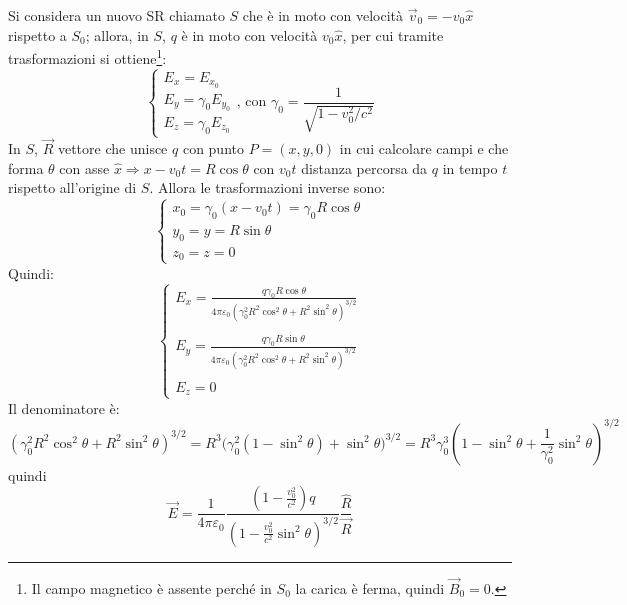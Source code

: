 \documentclass[a4paper]{scrartcl}
\numberwithin{equation}{subsection}
\theoremstyle{style1}
\begin{document}
Si considera un nuovo SR chiamato $S$ che \`e in moto con velocit\`a $\vec{v}_0 =  - v_0\hat{x}$ rispetto a $S_0$; allora, in $S$, $q $ \`e in moto con velocit\`a $v_0\hat{x}$, per cui tramite trasformazioni si ottiene\footnote{Il campo magnetico \`e assente perch\'e in $S_0$ la carica \`e ferma, quindi $\vec{B}_0 = 0$.}:
\begin{equation}
	\begin{cases}
		E_x = E_{x_0} \\
		E_y = \gamma_0 E_{y_0} \\
		E_{z} = \gamma_0 E_{z_0} 
	\end{cases} \text{, con } \gamma_0 = \frac{1}{\sqrt{1- v_0^2 / c^2} }
\end{equation}
In $S$, $\vec{R}$ vettore che unisce $q$ con punto $P=(x,y,0)$ in cui calcolare campi e che forma $\theta $ con asse $\hat{x} \Rightarrow x-v_0 t = R\cos \theta $ con $v_0 t$ distanza percorsa da $q$ in tempo $t$ rispetto all'origine di $S$. Allora le trasformazioni inverse sono:
\begin{equation}
	\begin{cases}
	x_0 = \gamma_0 (x-v_0t) = \gamma_0 R\cos\theta \\
	y_0 = y = R \sin \theta \\
	z_0 = z = 0
	\end{cases}
\end{equation}
Quindi:
\begin{equation}
	\begin{cases}
		\displaystyle E_x = \frac{q \gamma_0 R\cos \theta }{4\pi \varepsilon _0 (\gamma_0^2 R^2 \cos^2 \theta  + R^2 \sin^2 \theta )^{3 / 2} }\\
		\\
		\displaystyle E_y = \frac{q \gamma_0 R\sin \theta }{4\pi \varepsilon _0 (\gamma_0^2 R^2 \cos^2 \theta  + R^2 \sin^2 \theta )^{3 / 2} }\\
		\\
		\displaystyle E_z = 0
	\end{cases}
\end{equation}
Il denominatore \`e:
\[
(\gamma_0^2 R^2 \cos^2 \theta  + R^2 \sin^2 \theta )^{3 / 2}= R^3 \big(\gamma_0^2 (1- \sin^2 \theta ) + \sin^2 \theta \big)^{3 / 2} = R^3 \gamma_0^3 \left(1- \sin^2 \theta + \frac{1}{\gamma_0^2} \sin^2 \theta \right)^{3 / 2}   
\] 
quindi
\begin{equation}
	\vec{E} = \frac{1}{4\pi \varepsilon _0} \frac{\left(1 - \frac{v_0^2}{c^2}\right) q}{\left(1- \frac{v_0^2}{c^2}\sin^2 \theta \right) ^{3 / 2} } \frac{\hat{R}}{\vec{R}}
\end{equation}
\end{document}
